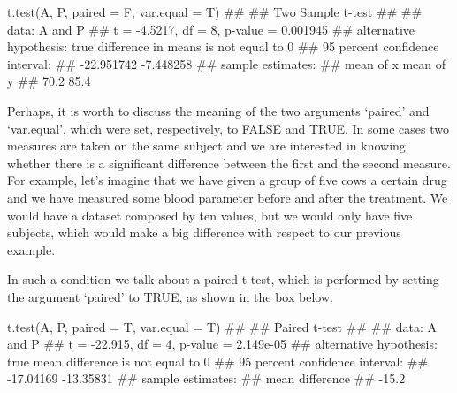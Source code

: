 \documentclass[a4paper,12pt,oneside]{book}
\newenvironment{Shaded}{\begin{snugshade}}{\end{snugshade}}
\newcommand{\DocumentationTok}[1]{#1}
\newcommand{\FunctionTok}[1]{#1}
\newcommand{\AttributeTok}[1]{#1}
\newcommand{\NormalTok}[1]{#1}
\begin{document}
\begin{Shaded}
\begin{Highlighting}[]
\FunctionTok{t.test}\NormalTok{(A, P, }\AttributeTok{paired =}\NormalTok{ F, }\AttributeTok{var.equal =}\NormalTok{ T)}
\DocumentationTok{\#\# }
\DocumentationTok{\#\#  Two Sample t{-}test}
\DocumentationTok{\#\# }
\DocumentationTok{\#\# data:  A and P}
\DocumentationTok{\#\# t = {-}4.5217, df = 8, p{-}value = 0.001945}
\DocumentationTok{\#\# alternative hypothesis: true difference in means is not equal to 0}
\DocumentationTok{\#\# 95 percent confidence interval:}
\DocumentationTok{\#\#  {-}22.951742  {-}7.448258}
\DocumentationTok{\#\# sample estimates:}
\DocumentationTok{\#\# mean of x mean of y }
\DocumentationTok{\#\#      70.2      85.4}
\end{Highlighting}
\end{Shaded}

Perhaps, it is worth to discuss the meaning of the two arguments `paired' and `var.equal', which were set, respectively, to FALSE and TRUE. In some cases two measures are taken on the same subject and we are interested in knowing whether there is a significant difference between the first and the second measure. For example, let's imagine that we have given a group of five cows a certain drug and we have measured some blood parameter before and after the treatment. We would have a dataset composed by ten values, but we would only have five subjects, which would make a big difference with respect to our previous example.

In such a condition we talk about a paired t-test, which is performed by setting the argument `paired' to TRUE, as shown in the box below.

\begin{Shaded}
\begin{Highlighting}[]
\FunctionTok{t.test}\NormalTok{(A, P, }\AttributeTok{paired =}\NormalTok{ T, }\AttributeTok{var.equal =}\NormalTok{ T)}
\DocumentationTok{\#\# }
\DocumentationTok{\#\#  Paired t{-}test}
\DocumentationTok{\#\# }
\DocumentationTok{\#\# data:  A and P}
\DocumentationTok{\#\# t = {-}22.915, df = 4, p{-}value = 2.149e{-}05}
\DocumentationTok{\#\# alternative hypothesis: true mean difference is not equal to 0}
\DocumentationTok{\#\# 95 percent confidence interval:}
\DocumentationTok{\#\#  {-}17.04169 {-}13.35831}
\DocumentationTok{\#\# sample estimates:}
\DocumentationTok{\#\# mean difference }
\DocumentationTok{\#\#           {-}15.2}
\end{Highlighting}
\end{Shaded}
\end{document}
